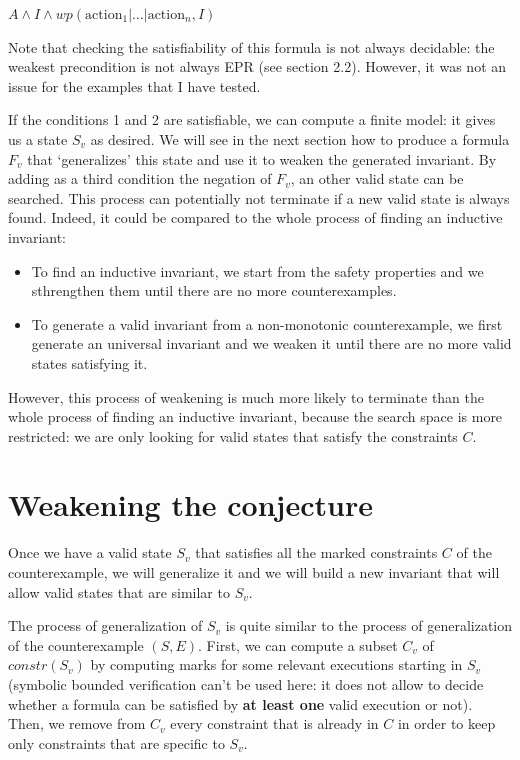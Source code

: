 \documentclass[11pt,a4paper,oldfontcommands,openany]{memoir}
\begin{document}
    \(A \land I \land wp(\text{action}_1|\ldots|\text{action}_n,I)\)

    Note that checking the satisfiability of this formula is not always decidable: the weakest precondition is not always EPR (see section 2.2).
    However, it was not an issue for the examples that I have tested.

    If the conditions 1 and 2 are satisfiable, we can compute a finite model: it gives us a state \(S_v\) as desired.
    We will see in the next section how to produce a formula \(F_v\) that `generalizes' this state and use it to weaken the generated invariant.
    By adding as a third condition the negation of \(F_v\), an other valid state can be searched.
    This process can potentially not terminate if a new valid state is always found. Indeed, it could be compared to the whole process of finding an inductive invariant:
    \begin{itemize}
        \item To find an inductive invariant, we start from the safety properties and we sthrengthen them until there are no more counterexamples.
        \item To generate a valid invariant from a non-monotonic counterexample, we first generate an universal invariant and we weaken it until there are no more valid states satisfying it.
    \end{itemize}
    However, this process of weakening is much more likely to terminate than the whole process of finding an inductive invariant, because the search space is more restricted:
    we are only looking for valid states that satisfy the constraints \(C\).

    \section{Weakening the conjecture}

    Once we have a valid state \(S_v\) that satisfies all the marked constraints \(C\) of the counterexample,
    we will generalize it and we will build a new invariant that will allow valid states that are similar to \(S_v\).

    The process of generalization of \(S_v\) is quite similar to the process of generalization of the counterexample \((S,E)\).
    First, we can compute a subset \(C_v\) of \(constr(S_v)\) by computing marks for some relevant executions starting in \(S_v\)
    (symbolic bounded verification can't be used here: it does not allow to decide whether a formula can be satisfied by \textbf{at least one} valid execution or not).
    Then, we remove from \(C_v\) every constraint that is already in \(C\) in order to keep only constraints that are specific to \(S_v\).
\end{document}
